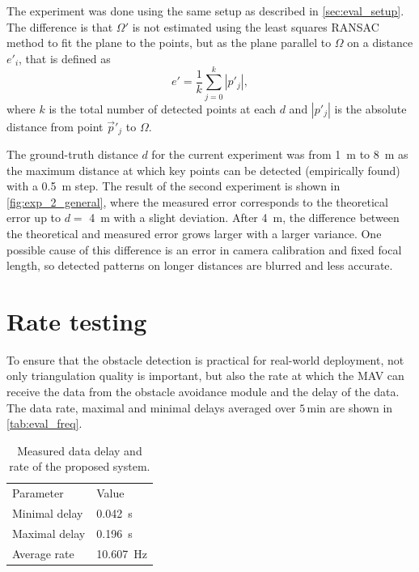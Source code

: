 The experiment was done using the same setup as described in \autoref{sec:eval_setup}. 
The difference is that $\Omega'$ is not estimated using the least squares RANSAC method to fit the plane to the points, but as the plane parallel to $\Omega$ on a distance $e'_i$, that is defined as
\begin{equation}    
    e' = \frac{1}{k} \sum_{j=0}^{k}{|p'_j|},
\end{equation}
where $k$ is the total number of detected points at each $d$ and $|p'_j|$ is the absolute distance from point $\vec{p}'_j$ to $\Omega$.

The ground-truth distance $d$ for the current experiment was from \SI{1}{\meter} to \SI{8}{\meter} as the maximum distance at which key points can be detected (empirically found) with a \SI{0.5}{\meter} step.
The result of the second experiment is shown in \autoref{fig:exp_2_general}, where the measured error corresponds to the theoretical error up to $d=$ \SI{4}{\meter} with a slight deviation. 
After \SI{4}{\meter}, the difference between the theoretical and measured error grows larger with a larger variance.
One possible cause of this difference is an error in camera calibration and fixed focal length, so detected patterns on longer distances are blurred and less accurate. 

\section{Rate testing}
To ensure that the obstacle detection is practical for real-world deployment, not only triangulation quality is important, but also the rate at which the MAV can receive the data from the obstacle avoidance module and the delay of the data.
The data rate, maximal and minimal delays averaged over $5\,$min are shown in \autoref{tab:eval_freq}.
\begin{table}[ht]
    \begin{center}
      \begin{tabular}{ll}
      \hline
        Parameter & Value \\
        Minimal delay &  \SI{0.042}{\second} \\
        Maximal delay &  \SI{0.196}{\second} \\
        Average rate & \SI{10.607}{\hertz} \\ 
      \end{tabular}
    \end{center}
    \caption{Measured data delay and rate of the proposed system.}
    \label{tab:eval_freq}
\end{table}
 
